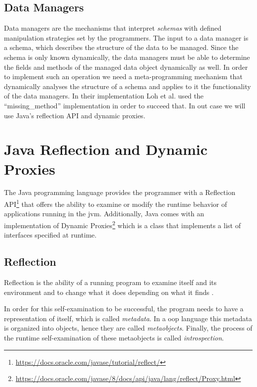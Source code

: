 \subsection{Data Managers}\label{Data Managers}
Data managers are the mechanisms that interpret \textit{schemas} with defined manipulation strategies set by the programmers. 
The input to a data manager is a schema, which describes the structure of the data to be managed.
Since the schema is only known dynamically, the data managers must be able to determine the fields and methods of the managed data object dynamically as well.
In order to implement such an operation we need a meta-programming mechanism that dynamically analyses the structure of a schema and applies to it the functionality of the data managers.
In their implementation Loh et al. \cite{loh2012managed} used the ``missing\_method'' implementation in order to succeed that.
In out case we will use Java's reflection API and dynamic proxies.

\section{Java Reflection and Dynamic Proxies}\label{Java Reflection and Dynamic Proxies}
The Java programming language provides the programmer with a Reflection API\footnote{\url{https://docs.oracle.com/javase/tutorial/reflect/}} that offers the ability to examine or modify the runtime behavior of applications running in the \ac{jvm}. 
Additionally, Java comes with an implementation of Dynamic Proxies\footnote{\url{https://docs.oracle.com/javase/8/docs/api/java/lang/reflect/Proxy.html}} which is a class that implements a list of interfaces specified at runtime.

\subsection{Reflection}\label{Reflection}

Reflection is the ability of a running program to examine itself and its environment and to change what it does depending on what it finds \cite{forman2004java}.

In order for this self-examination to be successful, the program needs to have a representation of itself, which is called \textit{metadata}.
In a \ac{oop} language this metadata is organized into objects, hence they are called \textit{metaobjects}. 
Finally, the process of the runtime self-examination of these metaobjects is called \textit{introspection}.

